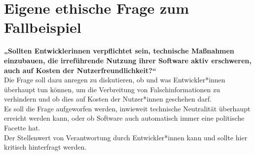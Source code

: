 \documentclass[12pt]{article}
\begin{document}
\pagebreak

\section{Eigene ethische Frage zum Fallbeispiel}

\textbf{„Sollten Entwicklerinnen verpflichtet sein, technische Maßnahmen einzubauen, die irreführende Nutzung ihrer Software aktiv erschweren, auch auf Kosten der Nutzerfreundlichkeit?“}\\

Die Frage soll dazu anregen zu diskutieren, ob und was Entwickler*innen überhaupt tun können, um die Verbreitung von Falschinformationen zu verhindern und ob dies auf Kosten der Nutzer*innen geschehen darf.\\
Es soll die Frage aufgeworfen werden, inwieweit technische Neutralität überhaupt erreicht werden kann, oder ob Software auch automatisch immer eine politische Facette hat.\\
Der Stellenwert von Verantwortung durch Entwickler*innen kann und sollte hier kritisch hinterfragt werden.
\end{document}
